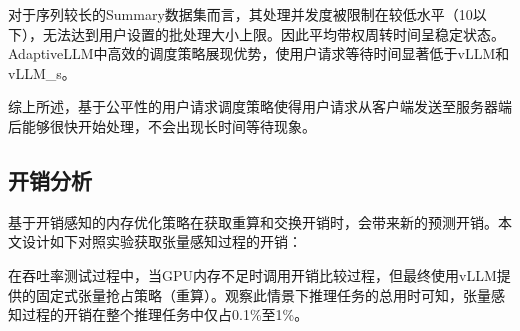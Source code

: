 对于序列较长的Summary数据集而言，其处理并发度被限制在较低水平（10以下），无法达到用户设置的批处理大小上限。因此平均带权周转时间呈稳定状态。AdaptiveLLM中高效的调度策略展现优势，使用户请求等待时间显著低于vLLM和vLLM\_s。\par

综上所述，基于公平性的用户请求调度策略使得用户请求从客户端发送至服务器端后能够很快开始处理，不会出现长时间等待现象。






\subsection{开销分析}

基于开销感知的内存优化策略在获取重算和交换开销时，会带来新的预测开销。本文设计如下对照实验获取张量感知过程的开销：  \par

在吞吐率测试过程中，当GPU内存不足时调用开销比较过程，但最终使用vLLM提供的固定式张量抢占策略（重算）。观察此情景下推理任务的总用时可知，张量感知过程的开销在整个推理任务中仅占0.1\%至1\%。


